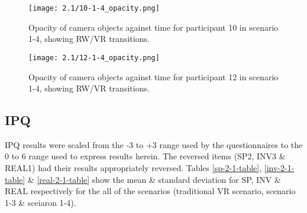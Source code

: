 \begin{figure}[h]
	\begin{center}
	\texttt{[image: 2.1/10-1-4\_opacity.png]}
	\caption{Opacity of camera objects against time for participant 10 in scenario 1-4, showing RW/VR transitions.}
	\label{10-1-4_opacity.png}
	\end{center}
\end{figure}

\begin{figure}[h]
	\begin{center}
	\texttt{[image: 2.1/12-1-4\_opacity.png]}
	\caption{Opacity of camera objects against time for participant 12 in scenario 1-4, showing RW/VR transitions.}
	\label{12-1-4_opacity.png}
	\end{center}
\end{figure}

	







\subsection{IPQ}

IPQ results were scaled from the -3 to +3 range used by the questionnaires to the 0 to 6 range used to express results herein. The reversed items (SP2, INV3 \& REAL1) had their results appropriately reversed. Tables \ref{sp-2-1-table}, \ref{inv-2-1-table} \& \ref{real-2-1-table} show the mean \& standard deviation for SP, INV \& REAL respectively for the all of the scenarios (traditional VR scenario, scenario 1-3 \& sceiaron 1-4).

